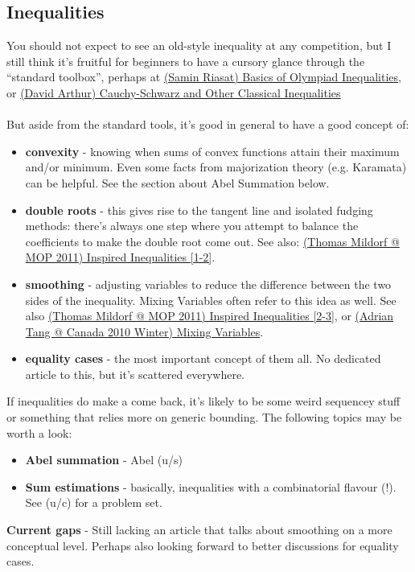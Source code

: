 \documentclass[a4paper]{article}
\begin{document}
	\subsection{Inequalities}
	You should not expect to see an old-style inequality at any competition, but I still think it's fruitful for beginners to have a cursory glance through the ``standard toolbox'', perhaps at  \href{run:./F_Algebra/(Samin Riasat) Basics of Olympiad Inequalities.pdf}{(Samin Riasat) Basics of Olympiad Inequalities}, or \href{run:./F_Algebra/(David Arthur) Cauchy-Schwarz and Other Classical Inequalities.pdf}{(David Arthur) Cauchy-Schwarz and Other Classical Inequalities}\\\\
	But aside from the standard tools, it's good in general to have a good concept of:
	\begin{itemize}
	\item \textbf{convexity} - knowing when sums of convex functions attain their maximum and/or minimum. Even some facts from majorization theory (e.g. Karamata) can be helpful. See the section about Abel Summation below.
	\item \textbf{double roots} - this gives rise to the tangent line and isolated fudging methods: there's always one step where you attempt to balance the coefficients to make the double root come out. See also: \href{run:./F_Algebra/(Thomas Mildorf @ MOP 2011) Inspired Inequalities.pdf}{(Thomas Mildorf @ MOP 2011) Inspired Inequalities [1-2]}.
	\item \textbf{smoothing} - adjusting variables to reduce the difference between the two sides of the inequality. Mixing Variables often refer to this idea as well. See also \href{run:./F_Algebra/(Thomas Mildorf @ MOP 2011) Inspired Inequalities.pdf}{(Thomas Mildorf @ MOP 2011) Inspired Inequalities [2-3]}, or \href{run:./F_Algebra/(Adrian Tang @ Canada 2010 Winter) Mixing Variables.pdf}{(Adrian Tang @ Canada 2010 Winter) Mixing Variables}.
	\item \textbf{equality cases} - the most important concept of them all. No dedicated article to this, but it's scattered everywhere.
	\end{itemize}
	If inequalities do make a come back, it's likely to be some weird sequencey stuff or something that relies more on generic bounding. The following topics may be worth a look:
	\begin{itemize}
	\item \textbf{Abel summation} - Abel (u/s)
	\item \textbf{Sum estimations} - basically, inequalities with a combinatorial flavour (!). See (u/c) for a problem set.
	\end{itemize}
	\textbf{Current gaps} - Still lacking an article that talks about smoothing on a more conceptual level. Perhaps also looking forward to better discussions for equality cases.
\end{document}
